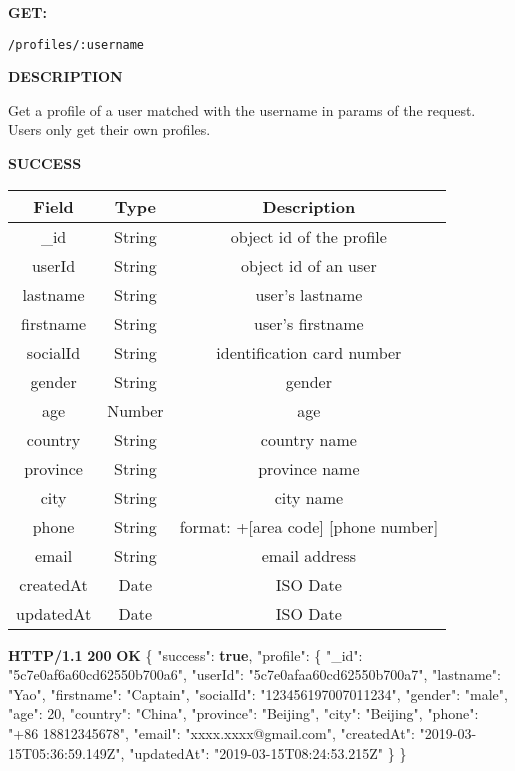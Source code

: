 \documentclass[
]{article}
\newenvironment{Shaded}{}{}
\newcommand{\DataTypeTok}[1]{\textcolor[rgb]{0.56,0.13,0.00}{#1}}
\newcommand{\DecValTok}[1]{\textcolor[rgb]{0.25,0.63,0.44}{#1}}
\newcommand{\ErrorTok}[1]{\textcolor[rgb]{1.00,0.00,0.00}{\textbf{#1}}}
\newcommand{\FunctionTok}[1]{\textcolor[rgb]{0.02,0.16,0.49}{#1}}
\newcommand{\KeywordTok}[1]{\textcolor[rgb]{0.00,0.44,0.13}{\textbf{#1}}}
\newcommand{\StringTok}[1]{\textcolor[rgb]{0.25,0.44,0.63}{#1}}
\begin{document}
\textbf{GET:}

\begin{verbatim}
/profiles/:username
\end{verbatim}

\textbf{DESCRIPTION}

Get a profile of a user matched with the username in params of the
request. Users only get their own profiles.

\textbf{SUCCESS}

\begin{longtable}[]{@{}ccc@{}}
\toprule
Field & Type & Description\tabularnewline
\midrule
\endhead
\_id & String & object id of the profile\tabularnewline
userId & String & object id of an user\tabularnewline
lastname & String & user's lastname\tabularnewline
firstname & String & user's firstname\tabularnewline
socialId & String & identification card number\tabularnewline
gender & String & gender\tabularnewline
age & Number & age\tabularnewline
country & String & country name\tabularnewline
province & String & province name\tabularnewline
city & String & city name\tabularnewline
phone & String & format: +{[}area code{]} {[}phone
number{]}\tabularnewline
email & String & email address\tabularnewline
createdAt & Date & ISO Date\tabularnewline
updatedAt & Date & ISO Date\tabularnewline
\bottomrule
\end{longtable}

\begin{Shaded}
\begin{Highlighting}[]
\ErrorTok{HTTP/1.1} \ErrorTok{200} \ErrorTok{OK}
\FunctionTok{\{}
    \DataTypeTok{"success"}\FunctionTok{:} \KeywordTok{true}\FunctionTok{,}
    \DataTypeTok{"profile"}\FunctionTok{:} \FunctionTok{\{}
        \DataTypeTok{"_id"}\FunctionTok{:} \StringTok{"5c7e0af6a60cd62550b700a6"}\FunctionTok{,}
        \DataTypeTok{"userId"}\FunctionTok{:} \StringTok{"5c7e0afaa60cd62550b700a7"}\FunctionTok{,}
        \DataTypeTok{"lastname"}\FunctionTok{:} \StringTok{"Yao"}\FunctionTok{,}
        \DataTypeTok{"firstname"}\FunctionTok{:} \StringTok{"Captain"}\FunctionTok{,}
        \DataTypeTok{"socialId"}\FunctionTok{:} \StringTok{"123456197007011234"}\FunctionTok{,}
        \DataTypeTok{"gender"}\FunctionTok{:} \StringTok{"male"}\FunctionTok{,}
        \DataTypeTok{"age"}\FunctionTok{:} \DecValTok{20}\FunctionTok{,}
        \DataTypeTok{"country"}\FunctionTok{:} \StringTok{"China"}\FunctionTok{,}
        \DataTypeTok{"province"}\FunctionTok{:} \StringTok{"Beijing"}\FunctionTok{,}
        \DataTypeTok{"city"}\FunctionTok{:} \StringTok{"Beijing"}\FunctionTok{,}
        \DataTypeTok{"phone"}\FunctionTok{:} \StringTok{"+86 18812345678"}\FunctionTok{,}
        \DataTypeTok{"email"}\FunctionTok{:} \StringTok{"xxxx.xxxx@gmail.com"}\FunctionTok{,}
        \DataTypeTok{"createdAt"}\FunctionTok{:} \StringTok{"2019-03-15T05:36:59.149Z"}\FunctionTok{,}
        \DataTypeTok{"updatedAt"}\FunctionTok{:} \StringTok{"2019-03-15T08:24:53.215Z"}
    \FunctionTok{\}}
\FunctionTok{\}}
\end{Highlighting}
\end{Shaded}
\end{document}
